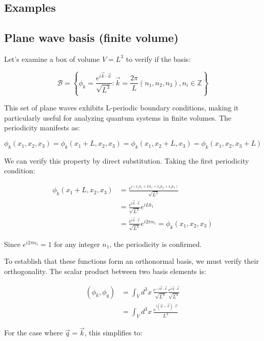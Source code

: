\documentclass[italian]{HKNdocument}
\begin{document}
\subsection{Examples}
\subsection{Plane wave basis (finite volume)}
Let's examine a box of volume $V = L^3$ to verify if the basis:


\begin{equation}
\mathcal{B} = \left\{\phi_k = \frac{e^{i\vec{k}\cdot\vec{x}}}{\sqrt{L^3}}: \vec{k} = \frac{2\pi}{L}(n_1, n_2, n_3), n_i \in \mathbb{Z}\right\}
\end{equation}

This set of plane waves exhibits L-periodic boundary conditions, making it particularly useful for analyzing quantum systems in finite volumes. The periodicity manifests as:

\begin{equation}
\phi_k(x_1, x_2, x_3) = \phi_k(x_1+L, x_2, x_3) = \phi_k(x_1, x_2+L, x_3) = \phi_k(x_1, x_2, x_3+L)
\end{equation}

We can verify this property by direct substitution. Taking the first periodicity condition:

\begin{align}
\phi_k(x_1+L, x_2, x_3) &= \frac{e^{i(x_1k_1+Lk_1+x_2k_2+x_3k_3)}}{\sqrt{L^3}} \\
&= \frac{e^{i\vec{k}\cdot\vec{x}}}{\sqrt{L^3}}e^{iLk_1} \\
&= \frac{e^{i\vec{k}\cdot\vec{x}}}{\sqrt{L^3}}e^{i2\pi n_1} = \phi_k(x_1, x_2, x_3)
\end{align}

Since $e^{i2\pi n_1} = 1$ for any integer $n_1$, the periodicity is confirmed.

To establish that these functions form an orthonormal basis, we must verify their orthogonality. The scalar product between two basis elements is:

\begin{align}
(\phi_k, \phi_q) &= \int_V d^3x\, \frac{e^{-i\vec{k}\cdot\vec{x}}}{\sqrt{L^3}} \frac{e^{i\vec{q}\cdot\vec{x}}}{\sqrt{L^3}} \\
&= \int_V d^3x\, \frac{e^{i(\vec{q}-\vec{k})\cdot\vec{x}}}{L^3}
\end{align}

For the case where $\vec{q} = \vec{k}$, this simplifies to:
\end{document}
